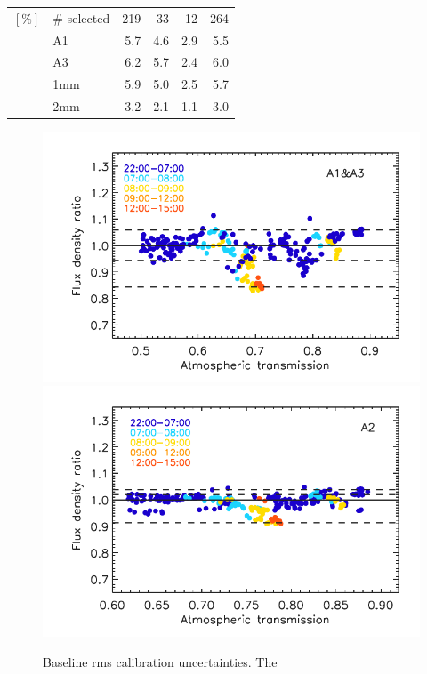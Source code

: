 \documentclass[traditionalabstract]{aa}
\begin{document}
{\begin{table}[!thbp]
\begin{center}
\begin{tabular}{clrrrr}
  $[\%]$ &  $\#$ selected &  219   &  33     &    12    &    264   \\
       &  A1            &  5.7   &  4.6    &   2.9    &    5.5   \\
       &  A3            &  6.2   &  5.7    &   2.4    &    6.0   \\
       &  1mm           &  5.9   &  5.0    &   2.5    &    5.7   \\
       &  2mm           &  3.2   &  2.1    &   1.1    &    3.0   \\  
\hline
\end{tabular}
\end{center}
\end{table}

\begin{figure}[!thbp]
  \begin{center}
      \includegraphics[clip=true, trim={0.9cm, 0, 0.5cm, 0.6cm},width=0.75\linewidth]{Figures/plot_flux_density_ratio_obstau_allbright_obsdate_corrected_skydip_rescaled_1mm.pdf}
     \includegraphics[clip=true, trim={0.9cm, 0, 0.5cm, 0.6cm},width=0.75\linewidth]{Figures/plot_flux_density_ratio_obstau_allbright_obsdate_corrected_skydip_rescaled_a2.pdf} 
    \caption[Baseline calibration rms error estimate]{Baseline
      rms calibration uncertainties. The
}
\end{center}
\end{figure}}
\end{document}
